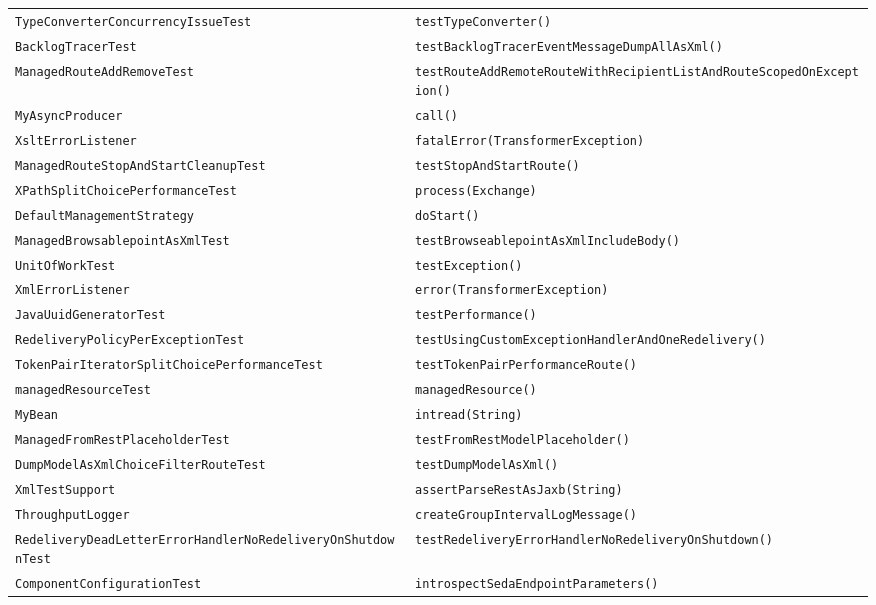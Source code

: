 \begin{center}
\begin{longtable}{ll}
\lstinline/TypeConverterConcurrencyIssueTest/&{\lstinline/testTypeConverter()/}\\
\lstinline/BacklogTracerTest/&{\lstinline/testBacklogTracerEventMessageDumpAllAsXml()/}\\
\lstinline/ManagedRouteAddRemoveTest/&{\lstinline/testRouteAddRemoteRouteWithRecipientListAndRouteScopedOnException()/}\\
\lstinline/MyAsyncProducer/&{\lstinline/call()/}\\
\lstinline/XsltErrorListener/&{\lstinline/fatalError(TransformerException)/}\\
\lstinline/ManagedRouteStopAndStartCleanupTest/&{\lstinline/testStopAndStartRoute()/}\\
\lstinline/XPathSplitChoicePerformanceTest/&{\lstinline/process(Exchange)/}\\
\lstinline/DefaultManagementStrategy/&{\lstinline/doStart()/}\\
\lstinline/ManagedBrowsablepointAsXmlTest/&{\lstinline/testBrowseablepointAsXmlIncludeBody()/}\\
\lstinline/UnitOfWorkTest/&{\lstinline/testException()/}\\
\lstinline/XmlErrorListener/&{\lstinline/error(TransformerException)/}\\
\lstinline/JavaUuidGeneratorTest/&{\lstinline/testPerformance()/}\\
\lstinline/RedeliveryPolicyPerExceptionTest/&{\lstinline/testUsingCustomExceptionHandlerAndOneRedelivery()/}\\
\lstinline/TokenPairIteratorSplitChoicePerformanceTest/&{\lstinline/testTokenPairPerformanceRoute()/}\\
\lstinline/managedResourceTest/&{\lstinline/managedResource()/}\\
\lstinline/MyBean/&{\lstinline/intread(String)/}\\
\lstinline/ManagedFromRestPlaceholderTest/&{\lstinline/testFromRestModelPlaceholder()/}\\
\lstinline/DumpModelAsXmlChoiceFilterRouteTest/&{\lstinline/testDumpModelAsXml()/}\\
\lstinline/XmlTestSupport/&{\lstinline/assertParseRestAsJaxb(String)/}\\
\lstinline/ThroughputLogger/&{\lstinline/createGroupIntervalLogMessage()/}\\
\lstinline/RedeliveryDeadLetterErrorHandlerNoRedeliveryOnShutdownTest/&{\lstinline/testRedeliveryErrorHandlerNoRedeliveryOnShutdown()/}\\
\lstinline/ComponentConfigurationTest/&{\lstinline/introspectSedaEndpointParameters()/}\\

\end{longtable}
\end{center}
